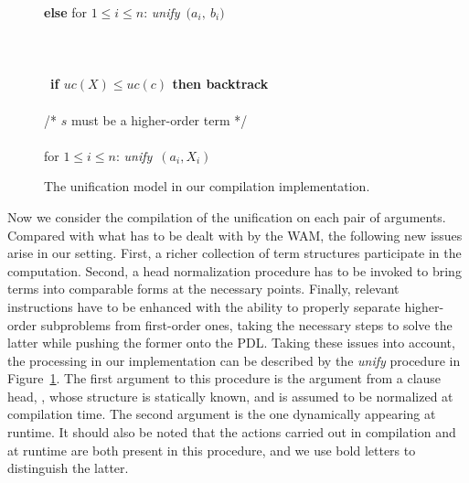 \begin{figure}
\begin{tabbing}
                  \>      \>            \> {\bf else } for $1\leq i \leq n$: {\it unify}\ $(a_i,\ ${\boldmath $b_i$}$)$  \\
                  \>        \> \\
                  \>      \>             \\
                  \>      \>            \\
                  \>      \>            \ \={\bf if \boldmath $uc(X) \leq uc(c)$ then backtrack} \\
                  \>      \>            \>             \\
                  \>      \>             /* $s$ must be a higher-order term */ \\
                  \>      \>            \>             \\
                  \>      \>            \>for $1\leq i \leq n$: {\it unify}\ $(a_i, X_i)$
\end{tabbing}
\caption{The unification model in our compilation
implementation.}\label{fig:unify}
\end{figure}

Now we consider the compilation
of the unification on each pair of arguments. Compared with what has
to be dealt with by the WAM, the following new issues arise in our
setting.
First, a richer collection of term structures participate in the
computation. Second, a head normalization procedure has to be invoked
to bring terms into comparable forms at the necessary
points. Finally, relevant instructions have to be enhanced with
the ability to properly separate higher-order subproblems from
first-order ones, taking the necessary steps to solve the latter while
pushing the former onto the PDL.
Taking these issues into account, the processing in our implementation can be
described by the {\it unify} procedure in Figure~\ref{fig:unify}.
The first argument to this procedure is the argument from a clause head,
\ie, whose structure is statically known, and is assumed to be normalized
at compilation time. The second argument is the one dynamically appearing
at runtime. It should also be noted that the actions carried out in
compilation and at runtime are both present in this procedure, and we use
bold letters to distinguish the latter.

